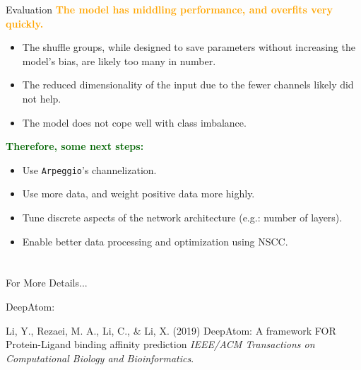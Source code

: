 \documentclass[aspectratio=169,xcolor=dvipsnames]{beamer}
\begin{document}
\begin{frame}{Evaluation}
    \textcolor{orange}{\textbf{The model has middling performance, and overfits very quickly.}}
    \begin{itemize}
        \item The shuffle groups, while designed to save parameters without 
        increasing the model's bias, are likely too many in number.
        \item The reduced dimensionality of the input due to the fewer channels likely did not help.
        \item The model does not cope well with class imbalance.
    \end{itemize}
    \textcolor{darkgreen}{\textbf{Therefore, some next steps:}}
    \begin{itemize}
        \item Use \texttt{Arpeggio}'s channelization.
        \item Use more data, and weight positive data more highly.
        \item Tune discrete aspects of the network architecture (e.g.: number of layers).
        \item Enable better data processing and optimization using NSCC.
    \end{itemize}
\end{frame}


\section{}
\begin{frame}{For More Details...}
    \footnotesize{
    DeepAtom:
    \begin{thebibliography}{99}
         Li, Y., Rezaei, M. A., Li, C., \& Li, X. (2019)
        \newblock DeepAtom: A framework FOR Protein-Ligand binding affinity prediction
        \newblock \emph{IEEE/ACM Transactions on Computational Biology and Bioinformatics}.
    \end{thebibliography}
    \vspace{3mm}
    }
\end{frame}
\end{document}
